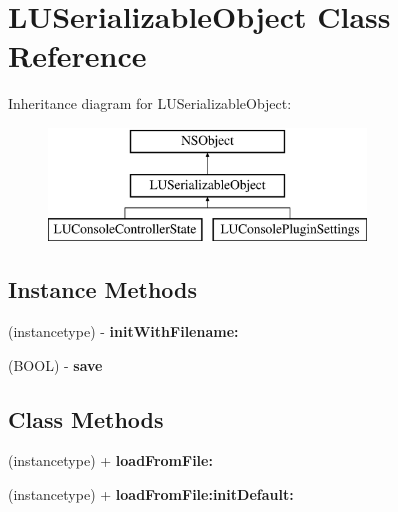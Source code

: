 \hypertarget{interface_l_u_serializable_object}{}\section{L\+U\+Serializable\+Object Class Reference}
\label{interface_l_u_serializable_object}
Inheritance diagram for L\+U\+Serializable\+Object\+:\begin{figure}[H]
\begin{center}
\leavevmode
\includegraphics[height=3.000000cm]{interface_l_u_serializable_object}
\end{center}
\end{figure}
\subsection*{Instance Methods}
\begin{DoxyCompactItemize}
\item 
\mbox{\label{interface_l_u_serializable_object_a595092c6f2e50ab8ad25c333092d4ef6}} 
(instancetype) -\/ {\bfseries init\+With\+Filename\+:}
\item 
\mbox{\label{interface_l_u_serializable_object_a6da5f91f465fbaa618bbbf93a0a80b9c}} 
(B\+O\+OL) -\/ {\bfseries save}
\end{DoxyCompactItemize}
\subsection*{Class Methods}
\begin{DoxyCompactItemize}
\item 
\mbox{\label{interface_l_u_serializable_object_ab3387c3f099713e3be70f8f3b216a2c8}} 
(instancetype) + {\bfseries load\+From\+File\+:}
\item 
\mbox{\label{interface_l_u_serializable_object_a92f01d7da257802cb6c4e67334dc27f6}} 
(instancetype) + {\bfseries load\+From\+File\+:init\+Default\+:}
\end{DoxyCompactItemize}


